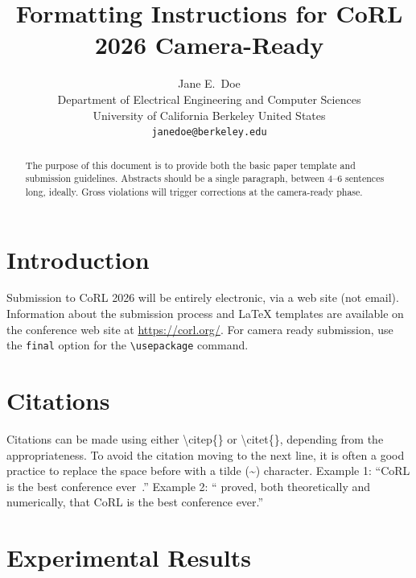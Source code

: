 \documentclass{article}
\title{Formatting Instructions for CoRL 2026 Camera-Ready}
\author{
  Jane E.~Doe\\
  Department of Electrical Engineering and Computer Sciences\\
  University of California Berkeley 
  United States\\
  \texttt{janedoe@berkeley.edu} \\
}
\begin{document}
\maketitle


\begin{abstract}
    The purpose of this document is to provide both the basic paper template and submission guidelines. Abstracts should be a single paragraph, between 4--6 sentences long, ideally. Gross violations will trigger corrections at the camera-ready phase.
\end{abstract}



\section{Introduction}
	
    Submission to CoRL 2026 will be entirely electronic, via a web site (not email). Information about the submission process and \LaTeX{} templates are available on the conference web site at \url{https://corl.org/}. For camera ready submission, use the \texttt{final} option for the \texttt{\textbackslash usepackage} command. 


\section{Citations}
\label{sec:citations}

	Citations can be made using either \textbackslash citep\{\} or \textbackslash citet\{\}, depending from the appropriateness. To avoid the citation moving to the next line, it is often a good practice to replace the space before with a tilde (\~{}) character.
	Example 1: ``CoRL is the best conference ever~\citep{Gauss1857}.''
	Example 2: ``\citet{Lagrange1788} proved, both theoretically and numerically, that CoRL is the best conference ever.''
	

\section{Experimental Results}
\label{sec:result}
\end{document}
